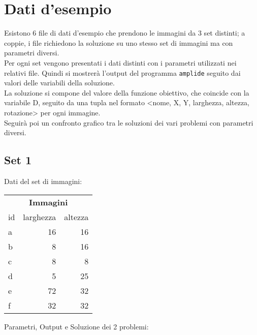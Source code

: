 
\section{Dati d'esempio}

	Esistono 6 file di dati d'esempio che prendono le immagini da 3 set distinti; a coppie, i file richiedono la soluzione su uno stesso set di immagini ma con parametri diversi. \\
	Per ogni set vengono presentati i dati distinti con i parametri utilizzati nei relativi file. Quindi si mostrerà l'output del programma \texttt{amplide} seguito dai valori delle variabili della soluzione. \\
	La soluzione si compone del valore della funzione obiettivo, che coincide con la variabile D, seguito da una tupla nel formato <nome, X, Y, larghezza, altezza, rotazione> per ogni immagine. \\
	Seguirà poi un confronto grafico tra le soluzioni dei vari problemi con parametri diversi.



	\subsection{Set 1}
Dati del set di immagini: 

\begin{table}[H]
\centering
\footnotesize
\begin{tabular}{l|r|r}
\multicolumn{3}{c}{\textbf{Immagini}} \\ 
id & larghezza & altezza \\
\hline
a & 16 & 16 \\
b & 8&16\\
c & 8& 8\\
d & 5&25\\
e & 72&32\\
f & 32 &32\\
\end{tabular}
\end{table}


\noindent Parametri, Output e Soluzione dei 2 problemi: 

